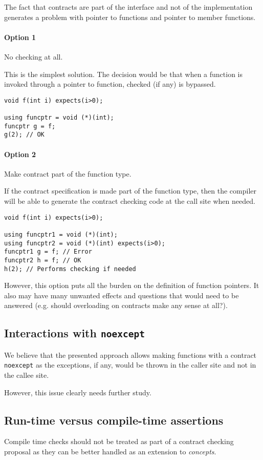 The fact that contracts are part of the interface and not of the
implementation generates a problem with pointer to functions and pointer to
member functions.


\paragraph{Option 1} No checking at all.

This is the simplest solution. The decision would be that when a function is
invoked through a pointer to function, checked (if any) is bypassed.

\begin{lstlisting}
void f(int i) expects(i>0);

using funcptr = void (*)(int);
funcptr g = f;
g(2); // OK
\end{lstlisting}

\paragraph{Option 2} Make contract part of the function type.

If the contract specification is made part of the function type, then the
compiler will be able to generate the contract checking code at the call site
when needed. 

\begin{lstlisting}
void f(int i) expects(i>0);

using funcptr1 = void (*)(int);
using funcptr2 = void (*)(int) expects(i>0);
funcptr1 g = f; // Error
funcptr2 h = f; // OK
h(2); // Performs checking if needed
\end{lstlisting}

However, this option puts all the burden on the definition of function pointers.
It also may have many unwanted effects and questions that would need to be
answered (e.g. should overloading on contracts make any sense at all?).

\subsection{Interactions with \texttt{noexcept}}

We believe that the presented approach allows making functions with a contract \texttt{noexcept}
as the exceptions, if any, would be thrown in the caller site and not in the
callee site.

However, this issue clearly needs further study.

\subsection{Run-time versus compile-time assertions}

Compile time checks should not be treated as part of a contract checking
proposal as they can be better handled as an extension to \emph{concepts}.

